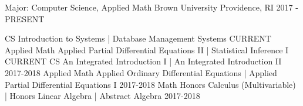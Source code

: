 \begin{cventries}
  \cventry
    {Major: Computer Science, Applied Math}
    {Brown University}
    {Providence, RI}
    {2017 - PRESENT}
    {
        \vspace{-2em}
        \begin{cvhonors}
			\cvhonor
			{CS}
			{Introduction to Systems | Database Management Systems}
			{}
			{CURRENT}
			\cvhonor
			{Applied Math}
			{Applied Partial Differential Equations II | Statistical Inference I}
			{}
			{CURRENT}
			\cvhonor
			{CS}
			{An Integrated Introduction I | An Integrated Introduction II}
			{}
			{2017-2018}
			\cvhonor
			{Applied Math}
			{Applied Ordinary Differential Equations | Applied Partial Differential Equations I}
			{}
			{2017-2018}
			\cvhonor
			{Math}
			{Honors Calculus (Multivariable) | Honors Linear Algebra | Abstract Algebra}
			{}
			{2017-2018}
        \end{cvhonors}
		\vspace{-1.25em}
    }
\end{cventries}

